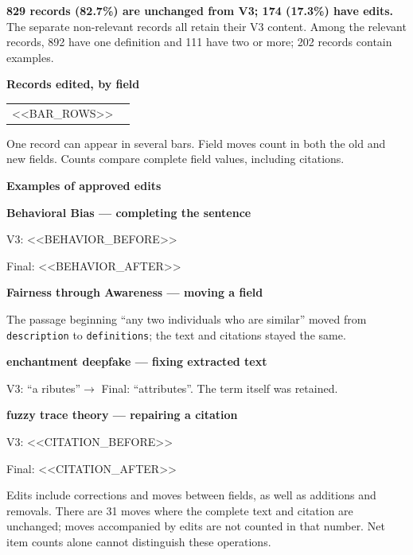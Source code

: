 \documentclass[10pt,a4paper]{article}
\newcommand{\file}[1]{{\small\texttt{#1}}}
\newcommand{\smallhead}[1]{\vspace{7pt}{\large\bfseries #1}\par\vspace{2pt}}
\begin{document}
\smallhead{What changed in the relevant records?}
\textbf{829 records (82.7\%) are unchanged from V3; 174 (17.3\%) have edits.}
The separate non-relevant records all retain their V3 content.
Among the relevant records, 892 have one definition and 111 have two or more;
202 records contain examples.

\vspace{5pt}
\begin{minipage}[t]{0.35\linewidth}
\textbf{Records edited, by field}\par
{\small
\begin{tabular}{@{}ll@{}}
<<BAR_ROWS>>
\end{tabular}}
\par\vspace{3pt}
{\footnotesize One record can appear in several bars. Field moves count in both
the old and new fields. Counts compare complete field values, including citations.}
\end{minipage}\hfill
\begin{minipage}[t]{0.60\linewidth}
\textbf{Examples of approved edits}\par
{\small
\textbf{Behavioral Bias --- completing the sentence}\par
\textcolor{before}{V3: <<BEHAVIOR_BEFORE>>}\par
\textcolor{added}{Final: <<BEHAVIOR_AFTER>>}\par
\textbf{Fairness through Awareness --- moving a field}\par
The passage beginning ``any two individuals who are similar'' moved from
\file{description} to \file{definitions}; the text and citations stayed the same.
\par
\textbf{enchantment deepfake --- fixing extracted text}\par
\textcolor{before}{V3: ``a ributes''}\quad$\rightarrow$\quad
\textcolor{added}{Final: ``attributes''}. The term itself was retained.
\par
\textbf{fuzzy trace theory --- repairing a citation}\par
\textcolor{before}{V3: <<CITATION_BEFORE>>}\par
\textcolor{added}{Final: <<CITATION_AFTER>>}
}
\end{minipage}

\smallhead{Reading these changes}
Edits include corrections and moves between fields, as well as additions and
removals. There are 31 moves where the complete text and citation are unchanged;
moves accompanied by edits are not counted in that number. Net item counts alone
cannot distinguish these operations.
\end{document}
